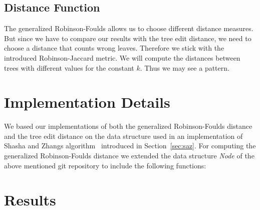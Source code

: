 \subsection{Distance Function}
The generalized Robinson-Foulds allows us to choose different distance measures. But since we have to compare our results with the tree edit distance, we need to choose a distance that counts wrong leaves. Therefore we stick with the introduced Robinson-Jaccard metric. We will compute the distances between trees with different values for the constant $k$. Thus we may see a pattern.

\section{Implementation Details}
We based our implementations of both the generalized Robinson-Foulds distance and the tree edit distance on the data structure used in an implementation of Shasha and Zhangs algorithm~\cite{Hen} introduced in Section~\ref{sec:saz}. For computing the generalized Robinson-Foulds distance we extended the data structure \textit{Node} of the above mentioned git repository to include the following functions:




\section{Results}
